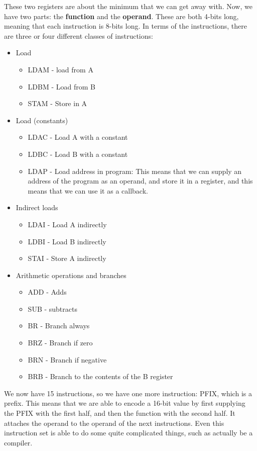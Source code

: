 \documentclass[11pt,a4paper,titlepage,dvipsnames,cmyk]{scrartcl}
\begin{document}
These two registers are about the minimum that we can get away with. Now,
we have two parts: the \textbf{function} and the \textbf{operand}. These
are both 4-bits long, meaning that each instruction is 8-bits long. In
terms of the instructions, there are three or four different classes of
instructions:
\begin{itemize}
    \item Load
    \begin{itemize}
        \item LDAM - load from A
        \item LDBM - Load from B
        \item STAM - Store in A
    \end{itemize}
    \item Load (constants)
    \begin{itemize}
        \item LDAC - Load A with a constant
        \item LDBC - Load B with a constant
        \item LDAP - Load address in program: This means that we can
            supply an address of the program as an operand, and store it
            in a register, and this means that we can use it as a
            callback.
    \end{itemize}
    \item Indirect loads
    \begin{itemize}
        \item LDAI - Load A indirectly
        \item LDBI - Load B indirectly
        \item STAI - Store A indirectly
    \end{itemize}
    \item Arithmetic operations and branches
    \begin{itemize}
        \item ADD - Adds
        \item SUB - subtracts
        \item BR - Branch always
        \item BRZ - Branch if zero
        \item BRN - Branch if negative
        \item BRB - Branch to the contents of the B register
    \end{itemize}
\end{itemize}

We now have 15 instructions, so we have one more instruction: PFIX, which
is a prefix. This means that we are able to encode a 16-bit value by first
supplying the PFIX with the first half, and then the function with the
second half. It attaches the operand to the operand of the next
instructions. Even this instruction set is able to do some quite
complicated things, such as actually be a compiler.
\end{document}
